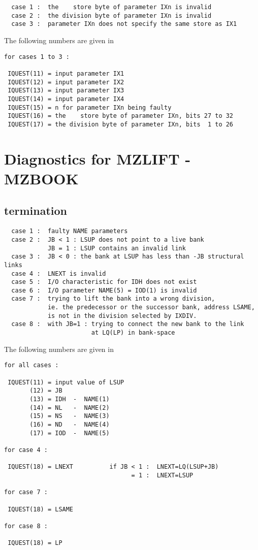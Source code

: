 \begin{verbatim}
  case 1 :  the    store byte of parameter IXn is invalid
  case 2 :  the division byte of parameter IXn is invalid
  case 3 :  parameter IXn does not specify the same store as IX1
\end{verbatim}

The following numbers are given in 

\begin{verbatim}
for cases 1 to 3 :

 IQUEST(11) = input parameter IX1
 IQUEST(12) = input parameter IX2
 IQUEST(13) = input parameter IX3
 IQUEST(14) = input parameter IX4
 IQUEST(15) = n for parameter IXn being faulty
 IQUEST(16) = the    store byte of parameter IXn, bits 27 to 32
 IQUEST(17) = the division byte of parameter IXn, bits  1 to 26
\end{verbatim}

\section{Diagnostics for MZLIFT - MZBOOK}


\subsection*{ termination}

\begin{verbatim}
  case 1 :  faulty NAME parameters
  case 2 :  JB < 1 : LSUP does not point to a live bank
            JB = 1 : LSUP contains an invalid link
  case 3 :  JB < 0 : the bank at LSUP has less than -JB structural links
  case 4 :  LNEXT is invalid
  case 5 :  I/O characteristic for IDH does not exist
  case 6 :  I/O parameter NAME(5) = IOD(1) is invalid
  case 7 :  trying to lift the bank into a wrong division,
            ie. the predecessor or the successor bank, address LSAME,
            is not in the division selected by IXDIV.
  case 8 :  with JB=1 : trying to connect the new bank to the link
                        at LQ(LP) in bank-space
\end{verbatim}

The following numbers are given in 

\begin{verbatim}
for all cases :

 IQUEST(11) = input value of LSUP
       (12) = JB
       (13) = IDH  -  NAME(1)
       (14) = NL   -  NAME(2)
       (15) = NS   -  NAME(3)
       (16) = ND   -  NAME(4)
       (17) = IOD  -  NAME(5)

for case 4 :

 IQUEST(18) = LNEXT          if JB < 1 :  LNEXT=LQ(LSUP+JB)
                                   = 1 :  LNEXT=LSUP

for case 7 :

 IQUEST(18) = LSAME

for case 8 :

 IQUEST(18) = LP
\end{verbatim}

